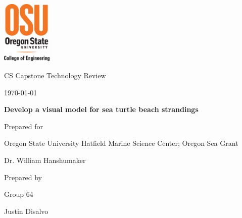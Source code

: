 \documentclass[onecolumn, draftclsnofoot,10pt, compsoc]{IEEEtran}
\def \CapstoneTeamName{   Beached Marine Critters Project Team}
\def \CapstoneTeamNumber{   64}
\def \GroupMemberOne{     Alea Weeks}
\def \GroupMemberTwo{     Amar Raad}
\def \GroupMemberThree{     Daniel Domme}
\def \GroupMemberFour{      Justin Disalvo}
\def \GroupMemberFive{      Zachary Tusing}
\def \CapstoneProjectName{    Develop a visual model for sea turtle beach strandings}
\def \CapstoneSponsorCompany{ Oregon State University Hatfield Marine Science Center; Oregon Sea Grant}
\def \CapstoneSponsorPerson{    Dr. William Hanshumaker}
\def \DocType{    %
        Technology Review
        }
\newcommand{\NameSigPair}[1]{\par
\makebox[2.75in][r]{#1} \hfil   \makebox[3.25in]{\makebox[2.25in]{\hrulefill} \hfill    \makebox[.75in]{\hrulefill}}
\par\vspace{-12pt} \textit{\tiny\noindent
\makebox[2.75in]{} \hfil    \makebox[3.25in]{\makebox[2.25in][r]{Signature} \hfill  \makebox[.75in][r]{Date}}}}
\renewcommand{\NameSigPair}[1]{#1}
\begin{document}
\begin{titlepage}
    \begin{singlespace}
     \includegraphics[height=3cm]{coe_v_spot1}
        \hfill 
        \par\vspace{.2in}
        \centering
        \scshape{
            \huge CS Capstone \DocType \par
            {\normalsize\today}\par
            \vspace{.5in}
            \textbf{\Huge\CapstoneProjectName}\par
            \vspace{1in}
            {\Large Prepared for}\par
            \huge \CapstoneSponsorCompany\par
            \vspace{5pt}
            {\Large\NameSigPair{\CapstoneSponsorPerson}\par}
            \vspace{.5in}
            {\large Prepared by }\par
            Group\CapstoneTeamNumber\par
            \vspace{5pt}
            {\Large
        \NameSigPair{\GroupMemberFour}\par
            }
            \vspace{20pt}
        }
        \vfill
        \begin{abstract}

\end{abstract}
\end{singlespace}
\end{titlepage}
\end{document}

